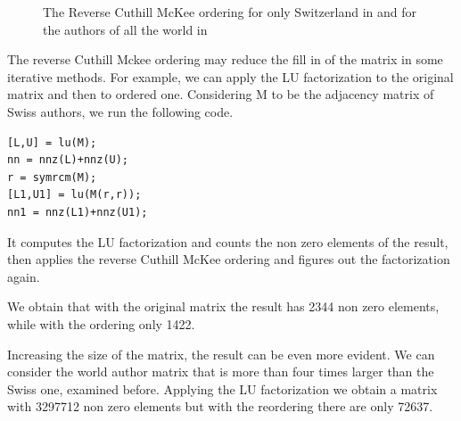 \documentclass[]{usiinfbachelorproject}
\begin{document}
\begin{figure}[tb]
	\centering
	\caption{ The Reverse Cuthill McKee ordering for only Switzerland in  and for the authors of all the world in }
	\label{fig:CuthillMcKee}
\end{figure}

The reverse Cuthill Mckee ordering may reduce the fill in of the matrix in some iterative methods. For example, we can apply the LU factorization to the original matrix and then to ordered one. Considering M to be the  adjacency matrix of Swiss authors, we run the following code.

\lstset{language=Matlab}
\begin{lstlisting}
[L,U] = lu(M); 	  
nn = nnz(L)+nnz(U);
r = symrcm(M);
[L1,U1] = lu(M(r,r));
nn1 = nnz(L1)+nnz(U1);
\end{lstlisting}

It computes the LU factorization and counts the non zero elements of the result, then applies the reverse Cuthill McKee ordering and figures out the factorization again.

We obtain that with the original matrix the result has 2344 non zero elements, while with the ordering only 1422. 

Increasing the size of the matrix, the result can be even more evident. We can consider the world author matrix that is more than four times larger than the Swiss one, examined before. Applying the LU factorization we obtain a matrix with 3297712 non zero elements but with the reordering there are only 72637.
\end{document}
